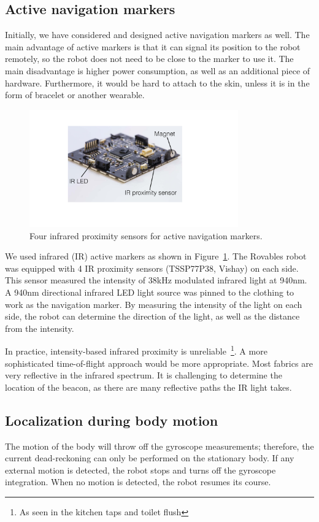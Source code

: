 \subsection{Active navigation markers}
Initially, we have considered and designed active navigation markers as well. The main advantage of active markers is that it can signal its position to the robot remotely, so the robot does not need to be close to the marker to use it. The main disadvantage is higher power consumption, as well as an additional piece of hardware. Furthermore, it would be hard to attach to the skin, unless it is in the form of bracelet or another wearable. 

\begin{figure}[!ht]
\centering
\includegraphics[width=9.0cm]{pictures/chapter5/ir_beacons.pdf}
\caption{Four infrared proximity sensors for active navigation markers.}
\label{fig:active_beacons}
\end{figure}

We used infrared (IR) active markers as shown in Figure~\ref{fig:active_beacons}. The Rovables robot was equipped with 4 IR proximity sensors (TSSP77P38, Vishay) on each side. This sensor measured the intensity of 38kHz modulated infrared light at 940nm. A 940nm  directional infrared LED light source was pinned to the clothing to work as the navigation marker. By measuring the intensity of the light on each side, the robot can determine the direction of the light, as well as the distance from the intensity. 

In practice, intensity-based infrared proximity is unreliable~\footnote{As seen in the kitchen taps and toilet flush}. A more sophisticated time-of-flight approach would be more appropriate. Most fabrics are very reflective in the infrared spectrum. It is challenging to determine the location of the beacon, as there are many reflective paths the IR light takes. 

\subsection{Localization during body motion}
The motion of the body will throw off the gyroscope measurements; therefore, the current dead-reckoning can only be performed on the stationary body. If any external motion is detected, the robot stops and turns off the gyroscope integration. When no motion is detected, the robot resumes its course. 

